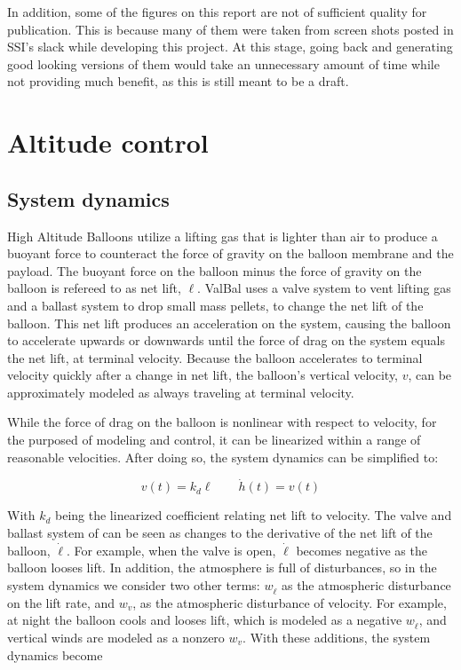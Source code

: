 \documentclass[11pt]{scrartcl} %
\begin{document}
In addition, some of the figures on this report are not of sufficient quality for publication. This is because many of them were taken from screen shots posted in SSI's slack while developing this project. At this stage, going back and generating good looking versions of them would take an unnecessary amount of time while not providing much benefit, as this is still meant to be a draft. 


\section{Altitude control}
\subsection{System dynamics}

High Altitude Balloons utilize a lifting gas that is lighter than air to produce a buoyant force to counteract the force of gravity on the balloon membrane and the payload. The buoyant force on the balloon minus the force of gravity on the balloon is refereed to as net lift, $\ell$. ValBal uses a valve system to vent lifting gas and a ballast system to drop small mass pellets, to change the net lift of the balloon. This net lift produces an acceleration on the system, causing the balloon to accelerate upwards or downwards until the force of drag on the system equals the net lift, at terminal velocity. Because the balloon accelerates to terminal velocity quickly after a change in net lift, the balloon's vertical velocity, $v$, can be approximately modeled as always traveling at terminal velocity.

While the force of drag on the balloon is nonlinear with respect to velocity, for the purposed of modeling and control, it can be linearized within a range of reasonable velocities. After doing so, the system dynamics can be simplified to:

\[ v(t) = k_d \ell \qquad \dot h(t) = v(t)\]

With $k_d$ being the linearized coefficient relating net lift to velocity. The valve and ballast system of can be seen as changes to the derivative of the net lift of the balloon, $\dot \ell$. For example, when the valve is open, $\dot \ell$ becomes negative as the balloon looses lift. In addition, the atmosphere is full of disturbances, so in the system dynamics we consider two other terms: $w_{\dot \ell}$ as the atmospheric disturbance on the lift rate, and $w_v$, as the atmospheric disturbance of velocity. For example, at night the balloon cools and looses lift, which is modeled as a negative $w_{\dot \ell}$, and vertical winds are modeled as a nonzero $w_v$. With these additions, the system dynamics become
\end{document}
